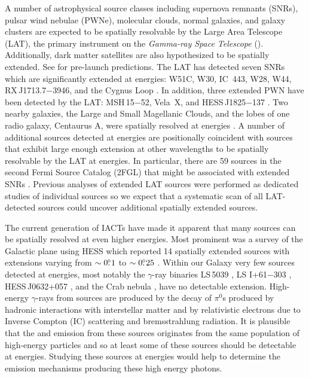 A number of astrophysical source classes including supernova remnants
(SNRs), pulsar wind nebulae (PWNe), molecular clouds, normal galaxies,
and galaxy clusters are expected to be spatially resolvable by the
Large Area Telescope (LAT), the primary instrument on the {\em
\fermi Gamma-ray Space Telescope} (\fermi).  Additionally, dark
matter satellites are also hypothesized to be spatially extended. See
\cite{atwood_2009a_large-telescope} for pre-launch predictions.  The LAT
has detected seven SNRs which are significantly extended at \gev energies:
W51C, W30, IC~443, W28, W44, RX\,J1713.7$-$3946, and the Cygnus Loop
\citep{abdo_2009a_fermi-discovery,ajello_2012a_fermi-large,abdo_2010a_observation-supernova,abdo_2010d_fermi-large,abdo_2010a_gamma-ray-emission,abdo_2011a_observations-young,katagiri_2011a_fermi-large}.
In addition, three extended PWN have been detected
by the LAT: MSH\,15$-$52, Vela~X, and HESS\,J1825$-$137
\citep{abdo_2010a_detection-energetic,abdo_2010c_fermi-large,grondin_2011a_detection-pulsar}.
Two nearby galaxies, the Large and Small Magellanic Clouds, and the lobes
of one radio galaxy, Centaurus A, were spatially resolved at \gev energies
\citep{abdo_2010a_observations-large,abdo_2010a_detection-small,abdo_2010a_fermi-gamma-ray}.
A number of additional sources detected at \gev energies are positionally
coincident with sources that exhibit large enough extension at other
wavelengths to be spatially resolvable by the LAT at \gev energies.
In particular, there are 59 \gev sources in the second Fermi
Source Catalog (2FGL) that might be associated with extended SNRs
\citep[2FGL,][]{nolan_2012_fermi-large}.  Previous analyses of extended
LAT sources were performed as dedicated studies of individual sources
so we expect that a systematic scan of all LAT-detected sources could
uncover additional spatially extended sources.

The current generation of \acp{IACT} have made it apparent that many
sources can be spatially resolved at even higher energies.  Most prominent
was a survey of the Galactic plane using \ac{HESS} which reported 14
spatially extended sources with extensions varying from $\sim0\mbox{$.\!\!^\circ$}1$
to $\sim0\mbox{$.\!\!^\circ$}25$ \citep{aharonian_2006a_h.e.s.s.-survey}.  Within our
Galaxy very few sources detected at \tev energies, most notably the
$\gamma$-ray binaries LS\,5039 \citep{aharonian_2006a_orbital-modulation},
LS I+61$-$303 \citep{albert_2006a_variable-very-high-energy,
acciari_2011a_veritas-observations}, HESS\,J0632+057
\citep{aharonian_2007a_discovery-point-like}, and the Crab nebula
\citep{weekes_1989a_observation-gamma}, have no detectable extension.
High-energy $\gamma$-rays from \tev sources are produced by the decay
of $\pi^0$s produced by hadronic interactions with interstellar matter
and by relativistic electrons due to Inverse Compton (IC) scattering and
bremsstrahlung radiation.  It is plausible that the \gev and \tev emission
from these sources originates from the same population of high-energy
particles and so at least some of these sources should be detectable at
\gev energies.  Studying these \tev sources at \gev energies would help
to determine the emission mechanisms producing these high energy photons.

